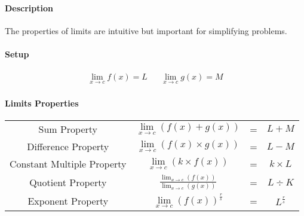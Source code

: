 \documentclass[12pt]{article}
\begin{document}
\paragraph{Description} The properties of limits are intuitive but important for simplifying problems.

\paragraph{Setup}
\begingroup \large
\begin{align*}
  \lim_{x \to c} f(x) = L && \lim_{x \to c} g(x) = M
\end{align*}
\endgroup

\paragraph{Limits Properties}
\begin{center}
\large {} %
\begin{tabular}{cccc}
  Sum Property & $\lim\limits_{x \to c} (f(x) + g(x))$ & = & $L + M$ \\
  Difference Property & $\lim\limits_{x \to c} (f(x) \times g(x))$ &
  = & $L -M$ \\
  Constant Multiple Property & $\lim\limits_{x \to c} (k \times f(x))$ &
  = & $k \times L$ \\
  Quotient Property & \LARGE $\frac{\lim_{x \to c} (f(x))}
  {\lim_{x \to c} (g(x))}$ & = & $L \div K$ \\
  Exponent Property & $\lim\limits_{x \to c} {(f(x))}^{\frac{r}{s}}$ &
  = & $L^{\frac{r}{s}}$
\end{tabular}
\end{center}
\end{document}
